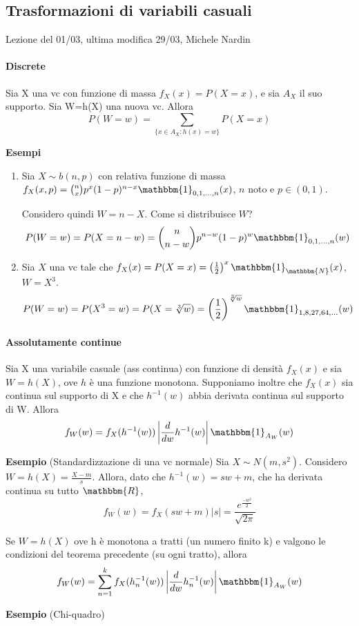 
\subsection{Trasformazioni di variabili casuali}
Lezione del 01/03, ultima modifica 29/03, Michele Nardin
\paragraph{Discrete}
\begin{teo}
Sia X una vc con funzione di massa $f_X(x)=P(X=x)$, e sia $A_X$ il suo supporto. 
Sia W=h(X) una nuova vc. Allora $$P(W=w)=\sum_{\{x\in A_X:h(x)=w\}}P(X=x)$$
\end{teo}

\noindent \textbf{Esempi}
\begin{enumerate}

\item Sia $X \sim b(n,p)$ con relativa funzione di massa 
$f_X(x,p)=\binom{n}{x}p^x(1-p)^{n-x}\mathbbm{1}_{0,1,...,n}(x)$,
$n$ noto e $p\in(0,1)$.

Considero quindi $W=n-X$. Come si distribuisce $W$? 
$$P(W=w)=P(X=n-w)=\binom{n}{n-w}p^{n-w}(1-p)^w\mathbbm{1}_{0,1,...,n}(w)$$
\item Sia $X$ una vc tale che 
$f_X(x)=P(X=x)=\left(\frac{1}{2}\right)^x\mathbbm{1}_\mathbbm{N}(x)$, $W=X^3$. 
$$P(W=w)=P(X^3=w)=P(X=\sqrt[3]{w})=\left(\frac{1}{2}\right)^{\sqrt[3]{w}}\mathbbm{1}_{1,8,27,64,...}(w)$$
\end{enumerate}

\paragraph{Assolutamente continue}
\begin{teo}
Sia X una variabile casuale (ass continua) con funzione di densità $f_X(x)$ e sia $W=h(X)$, ove $h$ è una funzione monotona. 
Supponiamo inoltre che $f_X(x)$ sia continua sul supporto di X e che $h^{-1}(w)$ abbia derivata continua sul supporto di W. Allora
$$f_W(w)=f_X(h^{-1}(w))\left|\frac{d}{dw}h^{-1}(w)\right|\mathbbm{1}_{A_W}(w)$$
\end{teo}
\noindent \textbf{Esempio}
(Standardizzazione di una vc normale)
Sia $X \sim N(m,s^2)$. 
Considero $W=h(X)=\frac{X-m}{s}$. 
Allora, dato che $h^{-1}(w)=sw+m$, 
che ha derivata continua su tutto $\mathbbm{R}$,  
$$f_W(w)=f_X(sw+m)|s|=\frac{e^{\frac{-w^2 }{2}}}{\sqrt{2\pi}}$$
\begin{teo}
Se $W=h(X)$ ove h è monotona a tratti (un numero finito k) e valgono le condizioni del teorema precedente (su ogni tratto), allora
$$f_W(w)=\sum_{n=1}^k f_X(h_n^{-1}(w))\left|\frac{d}{dw}h_n^{-1}(w)\right|\mathbbm{1}_{A_W}(w)$$
\end{teo}
\noindent \textbf{Esempio} (Chi-quadro)

